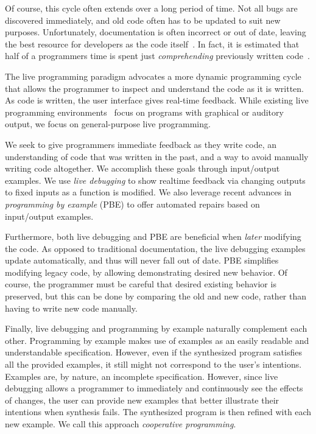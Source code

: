 Of course, this cycle often extends over a long period of time.
Not all bugs are discovered immediately,
and old code often has to be updated to suit new purposes.
Unfortunately, documentation is often incorrect or out of date,
leaving the best resource for developers as the code itself~\cite{latoza2006maintaining}.
In fact, it is estimated that half of a programmers time
is spent just \textit{comprehending} previously written code~\cite{corbi1989program}.

The live programming paradigm advocates a more dynamic programming cycle that allows the programmer to inspect and understand the code as it is written. As code is written, the user interface gives real-time feedback.  While existing live programming environments~\cite{victor2012, chugh2016programmatic, brown2009interacting} focus on programs with graphical or auditory output, we focus on general-purpose live programming.

We seek to give programmers immediate feedback as they write code,
an understanding of code that was written in the past, 
and a way to avoid manually writing code altogether.
We accomplish these goals through input/output examples.
We use \textit{live debugging} to show realtime feedback via changing outputs to fixed inputs as a function is modified.
We also leverage recent advances in \textit{programming by example} (PBE) to offer automated repairs based on input/output examples.

Furthermore, both live debugging and PBE are beneficial when \textit{later} modifying the code.
As opposed to traditional documentation, the live debugging examples update automatically, and thus will never fall out of date.
PBE simplifies modifying legacy code, by allowing demonstrating desired new behavior.
Of course, the programmer must be careful that desired existing behavior is preserved,
but this can be done by comparing the old and new code,
rather than having to write new code manually.

Finally, live debugging and programming by example naturally complement each other.
Programming by example makes use of examples as an easily readable and understandable specification. However, even if the synthesized program satisfies all the provided examples, it still might not correspond to the user's intentions. Examples are, by nature, an incomplete specification. However, since live debugging allows a programmer to immediately and continuously see the effects of changes, the user can provide new examples that better illustrate their intentions when synthesis fails. The synthesized program is then refined with each new example. We call this approach {\emph{cooperative programming}}.


